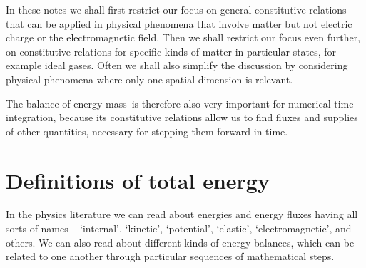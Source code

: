 \documentclass[a4paper,12pt,%
onecolumn,oneside,%
british%
]{memoir}
\renewcommand*{\|}[1][]{\nonscript\:#1\vert\nonscript\:\mathopen{}}
\newcommand*{\sect}{\S}%
\renewcommand*{\autoref}[3][\sect\,\ref]{\textcolor{blue}{#3}
\raisebox{0.6ex}{\color{blue}\miniscule%
\faIcon{angle-right}%
\;#1{#2}\;p.\,\pageref{#2}}}
\newcommand*{\energym}{energy-mass}
\begin{document}
In these notes we shall first restrict our focus on general constitutive relations that can be applied in physical phenomena that involve matter but not electric charge or the electromagnetic field. Then we shall restrict our focus even further, on constitutive relations for specific kinds of matter in particular states, for example ideal gases. Often we shall also simplify the discussion by considering physical phenomena where only one spatial dimension is relevant.

The balance of \energym\ is therefore also very important for numerical time integration, because its constitutive relations allow us to find fluxes and supplies of other quantities, necessary for stepping them forward in time.

% 

\section{Definitions of total energy}
\label{sec:energy_defs}

In the physics literature we can read about energies and energy fluxes having all sorts of names -- \enquote*{internal}, \enquote*{kinetic}, \enquote*{potential}, \enquote*{elastic}, \enquote*{electromagnetic}, and others. We can also read about different kinds of energy balances, which can be related to one another through particular sequences of mathematical steps.
\end{document}

